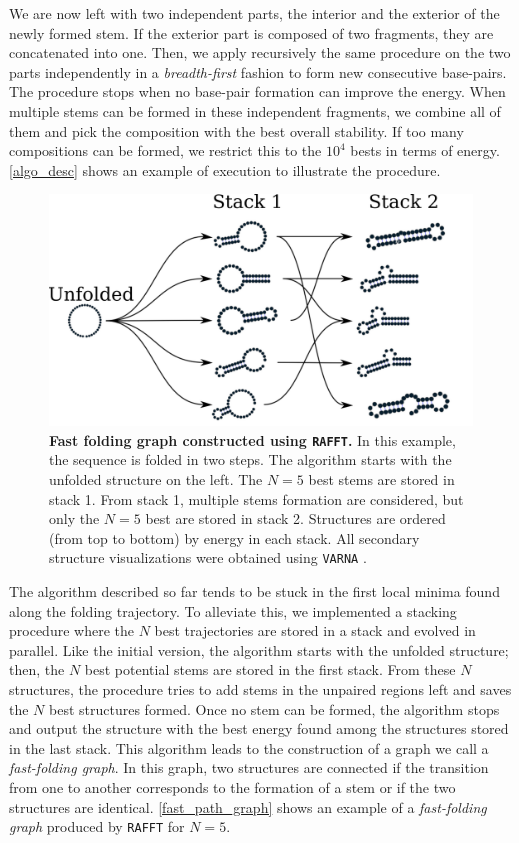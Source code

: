We are now left with two independent parts, the interior and the exterior of the newly formed stem. If the exterior part is composed of two fragments, they are concatenated into one. Then, we apply recursively the same procedure on the two parts independently in a \textit{breadth-first} fashion to form new consecutive base-pairs. The procedure stops when no base-pair formation can improve the energy. When multiple stems can be formed in these independent fragments, we combine all of them and pick the composition with the best overall stability. If too many compositions can be formed, we restrict this to the $10^4$ bests in terms of energy. \autoref{algo_desc} shows an example of execution to illustrate the procedure. 
\begin{figure}[t!]
	\centering
	\includegraphics[width=1\linewidth]{../res/images/rafft/fast_paths_graph.png}
	\caption{\label{fast_path_graph}\textbf{Fast folding graph constructed using \texttt{RAFFT}.} In this example, the sequence is folded in two steps. The algorithm starts with the unfolded structure on the left. The \(N=5\) best stems are stored in stack 1. From stack 1, multiple stems formation are considered, but only the \(N=5\) best are stored in stack 2. Structures are ordered (from top to bottom) by energy in each stack. All secondary structure visualizations were obtained using \texttt{VARNA} \cite{darty09_varna}.}
\end{figure}

The algorithm described so far tends to be stuck in the first local minima found along the folding trajectory. To alleviate this, we implemented a stacking procedure where the \(N\) best trajectories are stored in a stack and evolved in parallel. Like the initial version, the algorithm starts with the unfolded structure; then, the \(N\) best potential stems are stored in the first stack. From these \(N\) structures, the procedure tries to add stems in the unpaired regions left and saves the \(N\) best structures formed. Once no stem can be formed, the algorithm stops and output the structure with the best energy found among the structures stored in the last stack. This algorithm leads to the construction of a graph we call a \emph{fast-folding graph}. In this graph, two structures are connected if the transition from one to another corresponds to the formation of a stem or if the two structures are identical. \autoref{fast_path_graph} shows an example of a \emph{fast-folding graph} produced by \texttt{RAFFT} for $N=5$.

